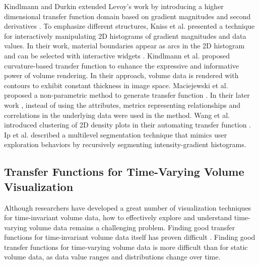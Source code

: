 Kindlmann and Durkin extended Levoy's work by introducing a higher dimensional transfer function domain based on gradient magnitudes and second derivatives \cite{kindlmann_semi-automatic_1998}. To emphasize different structures, Kniss et al. \cite{kniss_interactive_2001} presented a technique for interactively manipulating 2D histograms of gradient magnitudes and data values. In their work, material boundaries appear as arcs in the 2D histogram and can be selected with interactive widgets \cite{kniss_multidimensional_2002}.
Kindlmann et al. \cite{kindlmann_curvature-based_2003} proposed curvature-based transfer function to enhance the expressive and informative power of volume rendering. In their approach, volume data is rendered with contours to exhibit constant thickness in image space.
Maciejewski et al. proposed a non-parametric method to generate transfer function \cite{maciejewski_structuring_2009}.
In their later work \cite{maciejewski_abstracting_2013}, instead of using the attributes, metrics representing relationships and correlations in the underlying data were used in the method.
Wang et al. introduced clustering of 2D density plots in their automating transfer function \cite{wang_automating_2012}.
Ip et al. \cite{ip_hierarchical_2012} described a multilevel segmentation technique that mimics user exploration behaviors by recursively segmenting intensity-gradient histograms.


\subsection{Transfer Functions for Time-Varying Volume Visualization}
Although researchers have developed a great number of visualization techniques for time-invariant volume data, how to effectively explore and understand time-varying volume data remains a challenging problem. Finding good transfer functions for time-invariant volume data itself has proven difficult \cite{pfister_transfer_2001}.
Finding good transfer functions for time-varying volume data is more difficult than for static volume data, as data value ranges and distributions change over time.

